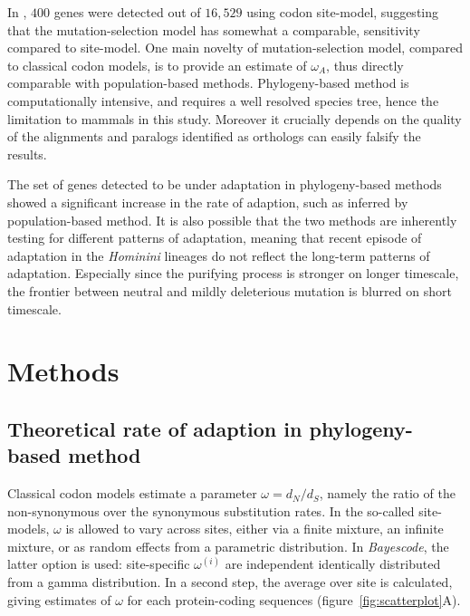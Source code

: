 \documentclass{article}
\newcommand{\dn}{d_N}
\newcommand{\ds}{d_S}
\newcommand{\dnds}{\dn / \ds}
\begin{document}
In \cite{kosiol_patterns_2008}, $400$ genes were detected out of $16,529$ using codon site-model, suggesting that the mutation-selection model has somewhat a comparable, sensitivity compared to site-model.
One main novelty of mutation-selection model, compared to classical codon models, is to provide an estimate of $\omega_A$, thus directly comparable with population-based methods.
Phylogeny-based method is computationally intensive, and requires a well resolved species tree, hence the limitation to mammals in this study.
Moreover it crucially depends on the quality of the alignments and paralogs identified as orthologs can easily falsify the results.

The set of genes detected to be under adaptation in phylogeny-based methods showed a significant increase in the rate of adaption, such as inferred by population-based method.
It is also possible that the two methods are inherently testing for different patterns of adaptation, meaning that recent episode of adaptation in the \textit{Hominini} lineages do not reflect the long-term patterns of adaptation.
Especially since the purifying process is stronger on longer timescale, the frontier between neutral and mildly deleterious mutation is blurred on short timescale\cite{ho_time_2005}.

\section*{Methods}

\subsection*{Theoretical rate of adaption in phylogeny-based method}
Classical codon models estimate a parameter $\omega=\dnds$, namely the ratio of the non-synonymous over the synonymous substitution rates\cite{muse_likelihood_1994,goldman_codon-based_1994}.
In the so-called site-models, $\omega$ is allowed to vary across sites, either via a finite mixture\cite{yang_codon-substitution_2000}, an infinite mixture\cite{huelsenbeck_dirichlet_2006}, or as random effects from a parametric distribution.
In \textit{Bayescode}, the latter option is used: site-specific $\omega^{(i)}$ are independent identically distributed from a gamma distribution\cite{lartillot_phylobayes_2013}.
In a second step, the average over site is calculated, giving estimates of $\omega$ for each protein-coding sequences (figure~\ref{fig:scatterplot}A).
\end{document}
